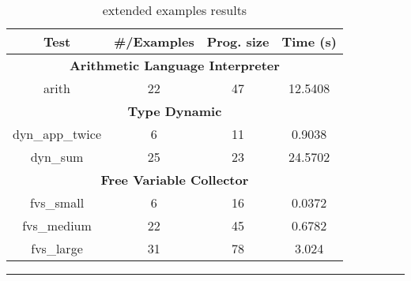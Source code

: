 \begin{table}
  \begin{center}
    \tabcolsep 5.8pt
    \footnotesize
    \begin{tabular}{|c|c|c|c|}
      \hline
      \textbf{Test} & \textbf{ \#/Examples } & \textbf{ Prog. size } & \textbf{Time (s)} \\
      \hline
      \multicolumn{4}{|c|}{\textbf{Arithmetic Language Interpreter}} \\
      \hline
      arith & 22 & 47 & 12.5408 \\
      \hline
      \multicolumn{4}{|c|}{\textbf{Type Dynamic}} \\
      \hline
      dyn\_app\_twice & 6 & 11 & 0.9038 \\
      \hline
      dyn\_sum & 25 & 23 & 24.5702 \\
      \hline
      \multicolumn{4}{|c|}{\textbf{Free Variable Collector}} \\
      \hline
      fvs\_small & 6 & 16 & 0.0372 \\
      \hline
      fvs\_medium & 22 & 45 & 0.6782 \\
      \hline
      fvs\_large & 31 & 78 & 3.024 \\
      \hline
    \end{tabular}
  \end{center}

  \hrule
  \caption{\myth{} extended examples results}
  \label{fig:myth-extended-examples-results}
\end{table}

